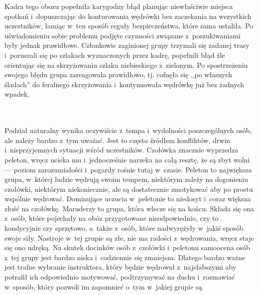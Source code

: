 \documentclass[a5paper,10pt,titlepage,twoside]{article}
\begin{document}
{{\begin{figure}[htp]
\end{figure}
Kadra tego obozu popełniła karygodny błąd planując niewłaściwie miejsca spotkań i~dopuszczając do konturowania wędrówki bez zaczekania na wszystkich uczestników, łamiąc w~ten sposób reguły bezpieczeństwa, które sama ustaliła. Po uświadomieniu sobie problemu podjęte czynności związane z~poszukiwaniami były jednak prawidłowe. Członkowie zaginionej grupy trzymali się zadanej trasy i~poruszali się po szlakach wyznaczonych przez kadrę, popełnili błąd źle orientując się na skrzyżowaniu szlaku niebieskiego z~zielonym. Po spostrzeżeniu swojego błędu grupa zareagowała prawidłowo, tj. cofnęła się ,,po własnych śladach'' do feralnego skrzyżowania i~kontynuowała wędrówkę już bez żadnych wpadek.}}
\\
\\
\indent Podział naturalny wynika oczywiście z~tempa i~wydolności poszczególnych osób, ale należy bardzo z~tym uważać. Jest to często źródłem konfliktów, drwin i~nieprzyjemnych sytuacji wśród uczestników. Czołówka znacznie wyprzedza peleton, wręcz ucieka mu i~jednocześnie narzeka na całą resztę, że są zbyt wolni --- poziom zarozumiałości i~pogardy rośnie tutaj w~czasie. Peleton to największa grupa, w~której ludzie wędrują swoim tempem, niektórym zależy na dogonieniu czołówki, niektórym niekoniecznie, ale są dostatecznie zmotykować aby po prostu wspólnie wędrować. Dominujące uczucia w~peletonie to niedosyt i~coraz większa złość na czołówkę. Maruderzy to grupa, która wlecze się na końcu. Składa się ona z~osób, które pojechały na obóz przygotowane nieodpowiednio, czy to kondycyjnie czy sprzętowo, a~także z~osób, które nadwyrężyły w~jakiś sposób swoje siły. Nastroje w~tej grupie są złe, nie ma radości z~wędrowania, wręcz staje się ono udręką. Na skutek docinków osób z~czołówki i~peletonu samoocena osób z~tej grupy jest bardzo niska i~codziennie się zmniejsza. Dlatego bardzo ważne jest trafne wybranie instruktora, który będzie wędrował z~najsłabszymi aby potrafił ich odpowiednio motywować, podtrzymywać na duchu i~rozmawiać w~sposób, który pozwoli im zapomnieć o~tym w~jakiej grupie są.
\end{document}
